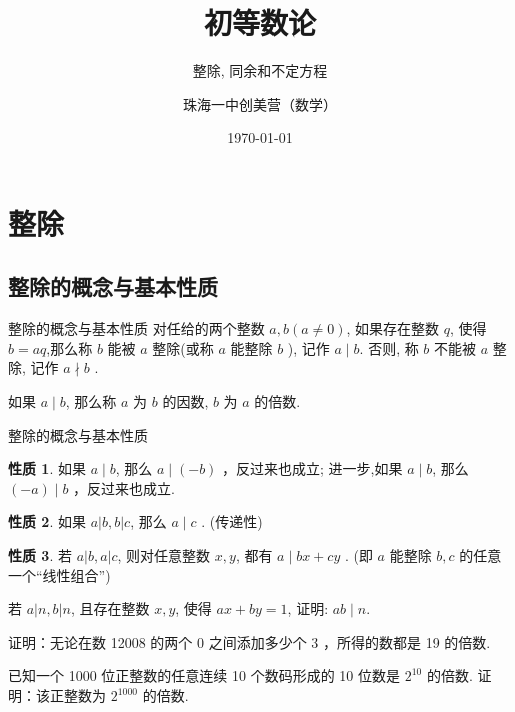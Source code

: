 \documentclass[aspectratio=169]{ctexbeamer}
\title[整除, 同余和不定方程]{初等数论}
\subtitle{整除, 同余和不定方程}
\author[珠海一中创美营]{珠海一中创美营（数学）}
\date[\today]{\today}
\theoremstyle{definition}
\newtheorem{property}{性质}[section]
\begin{document}
\frame{\titlepage}
\section{整除}
\subsection{整除的概念与基本性质}\setcounter{theorem}{0}
\begin{frame}{整除的概念与基本性质}
	对任给的两个整数 $a ,  b(a \neq 0)$, 如果存在整数 $q$, 使得 $b=a q$,那么称 $b$ 能被 $a$ 整除(或称 $a$ 能整除 $b$ ), 记作 $a \mid b$. 否则, 称 $b$ 不能被 $a$ 整除, 记作 $a \nmid b$ .

	如果 $a \mid b$, 那么称 $a$ 为 $b$ 的因数, $b$ 为 $a$ 的倍数.
\end{frame}

\begin{frame}{整除的概念与基本性质}
	\begin{property}
		如果 $a \mid b$, 那么 $a \mid(-b)$ ，反过来也成立; 进一步,如果 $a \mid b$, 那么 $(-a) \mid b$ ，反过来也成立.
	\end{property}
	\pause
	\begin{property}
		如果 $a|b, b| c$, 那么 $a \mid c$ . (传递性)
	\end{property}
	\pause
	\begin{property}
		若 $a|b, a| c$, 则对任意整数 $x ,  y$, 都有 $a \mid b x+c y$ . (即 $a$ 能整除 $b ,  c$ 的任意一个“线性组合”)
	\end{property}
\end{frame}

\begin{frame}[t]
	\begin{example}
		若 $a|n, b| n$, 且存在整数 $x ,  y$, 使得 $a x+b y=1$, 证明: $a b \mid n$.
	\end{example}
\end{frame}

\begin{frame}[t]
	\begin{example}
		证明：无论在数 12008 的两个 0 之间添加多少个 3 ，所得的数都是 19 的倍数.
	\end{example}
\end{frame}

\begin{frame}[t]
	\begin{example}
		已知一个 1000 位正整数的任意连续 10 个数码形成的 10 位数是 $2^{10}$ 的倍数. 证明：该正整数为 $2^{1000}$ 的倍数.
	\end{example}
\end{frame}
\end{document}
